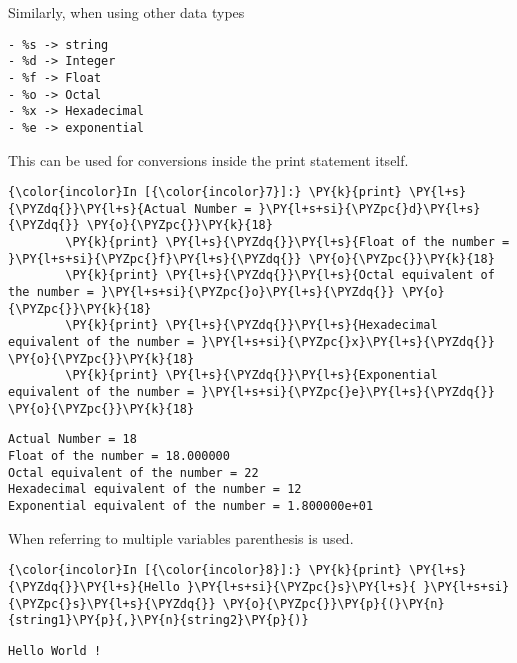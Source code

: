     Similarly, when using other data types

\begin{verbatim}
- %s -> string
- %d -> Integer
- %f -> Float
- %o -> Octal
- %x -> Hexadecimal
- %e -> exponential
\end{verbatim}

This can be used for conversions inside the print statement itself.

    \begin{Verbatim}[commandchars=\\\{\}]
{\color{incolor}In [{\color{incolor}7}]:} \PY{k}{print} \PY{l+s}{\PYZdq{}}\PY{l+s}{Actual Number = }\PY{l+s+si}{\PYZpc{}d}\PY{l+s}{\PYZdq{}} \PY{o}{\PYZpc{}}\PY{k}{18}
        \PY{k}{print} \PY{l+s}{\PYZdq{}}\PY{l+s}{Float of the number = }\PY{l+s+si}{\PYZpc{}f}\PY{l+s}{\PYZdq{}} \PY{o}{\PYZpc{}}\PY{k}{18}
        \PY{k}{print} \PY{l+s}{\PYZdq{}}\PY{l+s}{Octal equivalent of the number = }\PY{l+s+si}{\PYZpc{}o}\PY{l+s}{\PYZdq{}} \PY{o}{\PYZpc{}}\PY{k}{18}
        \PY{k}{print} \PY{l+s}{\PYZdq{}}\PY{l+s}{Hexadecimal equivalent of the number = }\PY{l+s+si}{\PYZpc{}x}\PY{l+s}{\PYZdq{}} \PY{o}{\PYZpc{}}\PY{k}{18}
        \PY{k}{print} \PY{l+s}{\PYZdq{}}\PY{l+s}{Exponential equivalent of the number = }\PY{l+s+si}{\PYZpc{}e}\PY{l+s}{\PYZdq{}} \PY{o}{\PYZpc{}}\PY{k}{18}
\end{Verbatim}

    \begin{Verbatim}[commandchars=\\\{\}]
Actual Number = 18
Float of the number = 18.000000
Octal equivalent of the number = 22
Hexadecimal equivalent of the number = 12
Exponential equivalent of the number = 1.800000e+01
    \end{Verbatim}

    When referring to multiple variables parenthesis is used.

    \begin{Verbatim}[commandchars=\\\{\}]
{\color{incolor}In [{\color{incolor}8}]:} \PY{k}{print} \PY{l+s}{\PYZdq{}}\PY{l+s}{Hello }\PY{l+s+si}{\PYZpc{}s}\PY{l+s}{ }\PY{l+s+si}{\PYZpc{}s}\PY{l+s}{\PYZdq{}} \PY{o}{\PYZpc{}}\PY{p}{(}\PY{n}{string1}\PY{p}{,}\PY{n}{string2}\PY{p}{)}
\end{Verbatim}

    \begin{Verbatim}[commandchars=\\\{\}]
Hello World !
    \end{Verbatim}


